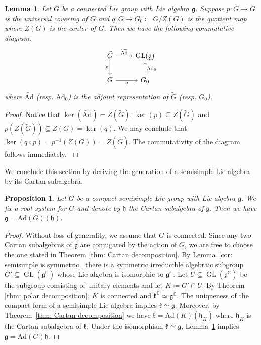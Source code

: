 \documentclass[11pt,reqno]{amsart}
\DeclareMathOperator{\GL}{GL}
\newtheorem{lemma}[theorem]{Lemma}
\newtheorem{proposition}[theorem]{Proposition}
\newcommand{\Ad}{\mathrm{Ad}}
\begin{document}
\begin{lemma}\label{thm: adjoint factor thru}
Let $G$ be a connected Lie group with Lie algebra $\mathfrak{g}$.  Suppose $p:  \widetilde{G} \to G$ is the universal covering of $G$ and $q: G \to G_0 \coloneqq G/Z(G)$ is the quotient map where $Z(G)$ is the center of $G$.  Then we have the following commutative diagram: 
\[
\begin{tikzcd}
\widetilde{G} \arrow{r}{\widetilde{\Ad}} \arrow[swap]{d}{p}
& \GL(\mathfrak{g}) \\
G \arrow[swap]{r}{q} & G_0 \arrow[swap]{u}{\Ad_0}
\end{tikzcd}        
\]
where $\widetilde{\Ad}$ (resp.  $\Ad_0$) is the adjoint representation of $\widetilde{G}$ (resp.  $G_0$).
\end{lemma}
\begin{proof}
{Notice that $\ker \left( \widetilde{\Ad} \right) = Z \left( \widetilde{G} \right)$,  $\ker(p) \subseteq Z \left( \widetilde{G} \right)$ and $p\left( Z\left( \widetilde{G} \right) \right) \subseteq Z(G) = \ker(q)$.  We may conclude that $\ker(q \circ p) = p^{-1} (Z(G)) = Z\left( \widetilde{G} \right)$. The commutativity of the diagram follows immediately. }
\end{proof}
We conclude this section by deriving the generation of a semisimple Lie algebra by its Cartan subalgebra.
{\begin{proposition}\label{prop: compact form generates}
Let $G$ be a compact semisimple Lie group with Lie algebra $\mathfrak{g}$.  We fix a root system for $G$ and denote by $\mathfrak{h}$ the Cartan subalgebra of $\mathfrak{g}$.  Then we have $\mathfrak{g} = \Ad(G)(\mathfrak{h})$.
\end{proposition}
\begin{proof}
Without loss of generality,  we assume that $G$ is connected.  Since any two Cartan subalgebras of $\mathfrak{g}$ are conjugated by the action of $G$, we are free to choose the one stated in Theorem \ref{thm: Cartan decomposition}.  By Lemma~\ref{cor: semisimple is symmetric},  there is a symmetric irreducible algebraic subgroup $G' \subseteq \GL \left( \mathfrak{g}^{\mathbb{C}} \right)$ whose Lie algebra is isomorphic to $\mathfrak{g}^{\mathbb{C}}$.  Let $U \subseteq \GL \left( \mathfrak{g}^{\mathbb{C}} \right)$ be the subgroup consisting of unitary elements and let $K \coloneqq G' \cap U$.  By Theorem \ref{thm: polar decomposition},  $K$ is connected and $\mathfrak{k}^{\mathbb{C}} \simeq \mathfrak{g}^{\mathbb{C}}$.  The uniqueness of the compact form of a semisimple Lie algebra implies $\mathfrak{k} \simeq \mathfrak{g}$.  Moreover,  by Theorem~\ref{thm: Cartan decomposition} we have $\mathfrak{k} = \Ad(K)(\mathfrak{h}_K)$ where $\mathfrak{h}_K$ is the Cartan subalgebra of $\mathfrak{k}$.  Under the isomorphism $\mathfrak{k} \simeq \mathfrak{g}$,   Lemma~\ref{thm: adjoint factor thru} implies $\mathfrak{g} = \Ad(G) \mathfrak{h}$.
\end{proof}}
\end{document}

